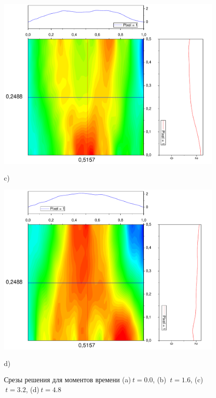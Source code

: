 \documentclass[a4paper,12pt]{article}
\begin{document}
\begin{figure}[h!]
\begin{center}
\begin{minipage}[h]{0.24\linewidth}
		\end{minipage}
		\begin{minipage}[h]{0.24\linewidth}
			\includegraphics[width=\textwidth]{graphs/graphs_l/v1/wave_t-16_v1_srez} \begin{center}	c)	\end{center}
		\end{minipage}
		\begin{minipage}[h]{0.24\linewidth}
			\includegraphics[width=\textwidth]{graphs/graphs_l/v1/wave_t-24_v1_srez} \begin{center}	d)	\end{center}
		\end{minipage}
	\end{center}
	\caption{Срезы решения для моментов времени (a)$\ t = 0.0$, (b) $\ t = 1.6$, (c)$\ t = 3.2$, (d)$\ t = 4.8$}
\end{figure}
\end{document}

